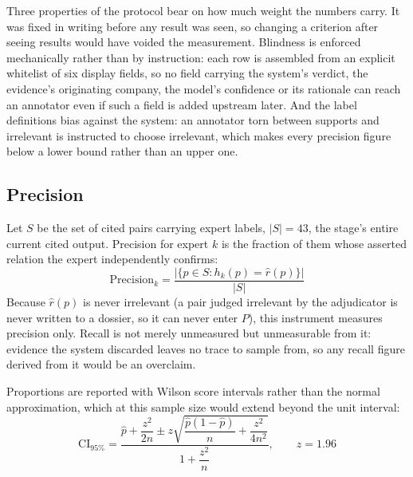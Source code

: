 \documentclass[fontsize=12pt,oneside,headings=small]{scrreprt}
\begin{document}
Three properties of the protocol bear on how much weight the numbers carry. It was fixed in writing before any result was seen, so changing a criterion after seeing results would have voided the measurement. Blindness is enforced mechanically rather than by instruction: each row is assembled from an explicit whitelist of six display fields, so no field carrying the system's verdict, the evidence's originating company, the model's confidence or its rationale can reach an annotator even if such a field is added upstream later. And the label definitions bias against the system: an annotator torn between \textsf{supports} and \textsf{irrelevant} is instructed to choose \textsf{irrelevant}, which makes every precision figure below a lower bound rather than an upper one.

\subsection{Precision}

Let $S$ be the set of cited pairs carrying expert labels, $|S|=43$, the stage's entire current cited output. Precision for expert $k$ is the fraction of them whose asserted relation the expert independently confirms:
\[
\mathrm{Precision}_k=\frac{\bigl|\{p\in S:h_k(p)=\hat{r}(p)\}\bigr|}{|S|}
\]
Because $\hat{r}(p)$ is never \textsf{irrelevant} (a pair judged irrelevant by the adjudicator is never written to a dossier, so it can never enter $P$), this instrument measures precision only. Recall is not merely unmeasured but unmeasurable from it: evidence the system discarded leaves no trace to sample from, so any recall figure derived from it would be an overclaim.

Proportions are reported with Wilson score intervals \cite{wilson1927probable} rather than the normal approximation, which at this sample size would extend beyond the unit interval:
\[
\mathrm{CI}_{95\%}=\frac{\hat{p}+\dfrac{z^{2}}{2n}\pm z\sqrt{\dfrac{\hat{p}(1-\hat{p})}{n}+\dfrac{z^{2}}{4n^{2}}}}{1+\dfrac{z^{2}}{n}},\qquad z=1.96
\]
\end{document}
